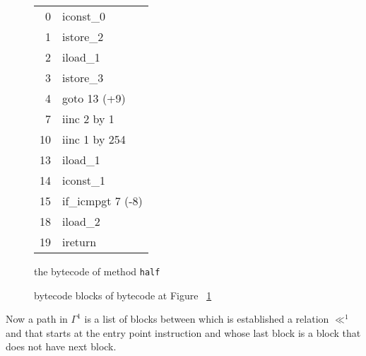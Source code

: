 \begin{figure}[p]
\begin{center}
\begin{tabular}{rl}
 0 & iconst\_0\\ 
 1 & istore\_2\\
 2 & iload\_1\\
 3 & istore\_3\\%
 4 & goto 13 (+9)\\%
 7 & iinc 2 by 1\\%
10 & iinc 1 by 254\\%
13 & iload\_1\\%
14 & iconst\_1\\%
15 & if\_icmpgt 7 (-8)\\%
18 & iload\_2\\%
19 & ireturn\\%
\end{tabular}
\end{center}
\caption{the bytecode of method \texttt{half}}
\label{halfBC}
\end{figure}

\begin{figure}[p]
\begin{center}
\end{center}
\caption{bytecode blocks of bytecode at Figure ~\ref{halfBC}}
\label{blockBC}
\end{figure}

Now a path in $\Gamma^1$  is a list of blocks between which is established a relation $\ll^1$ and that starts at the entry point instruction and whose last block is a block that does not have next block.

